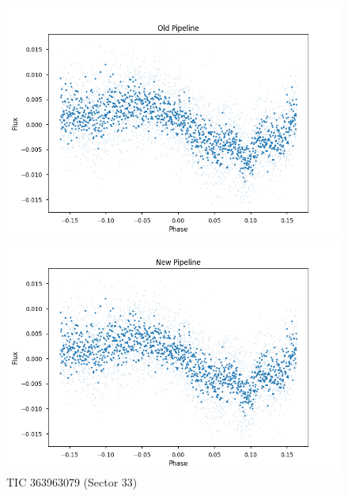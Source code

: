 \documentclass{article}
\begin{document}
\begin{figure}[h!]
    \centering
    \begin{minipage}{0.45\textwidth}
        \centering
        \includegraphics[width=\textwidth]{./figures/5_old.png}
    \end{minipage}%
    \hfill
    \begin{minipage}{0.45\textwidth}
        \centering
        \includegraphics[width=\textwidth]{./figures/5_new.png}
    \end{minipage}
    \caption{TIC 363963079 (Sector 33)}
\end{figure}
\end{document}
